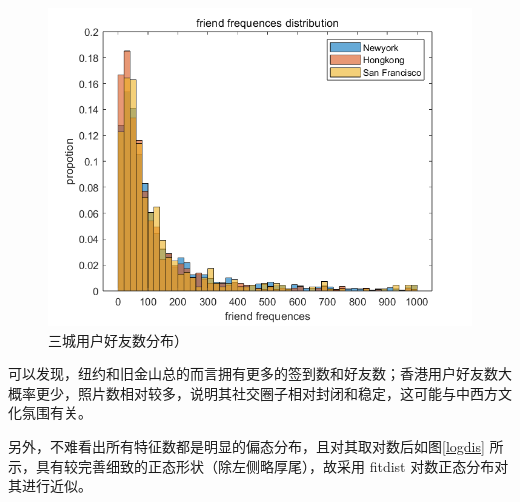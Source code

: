 \documentclass[UTF8]{ctexart}
\begin{document}
		\begin{figure}[H]
			\centering
			\includegraphics[scale=0.4]{friendDis_all_nhs.png}
			\caption{三城用户好友数分布）}
			\label{fd_nhs}
		\end{figure}
	
		可以发现，纽约和旧金山总的而言拥有更多的签到数和好友数；香港用户好友数大概率更少，照片数相对较多，说明其社交圈子相对封闭和稳定，这可能与中西方文化氛围有关。
		
		另外，不难看出所有特征数都是明显的偏态分布，且对其取对数后如图\ref{logdis} 所示，具有较完善细致的正态形状（除左侧略厚尾），故采用 fitdist 对数正态分布对其进行近似。
		
\end{document}
